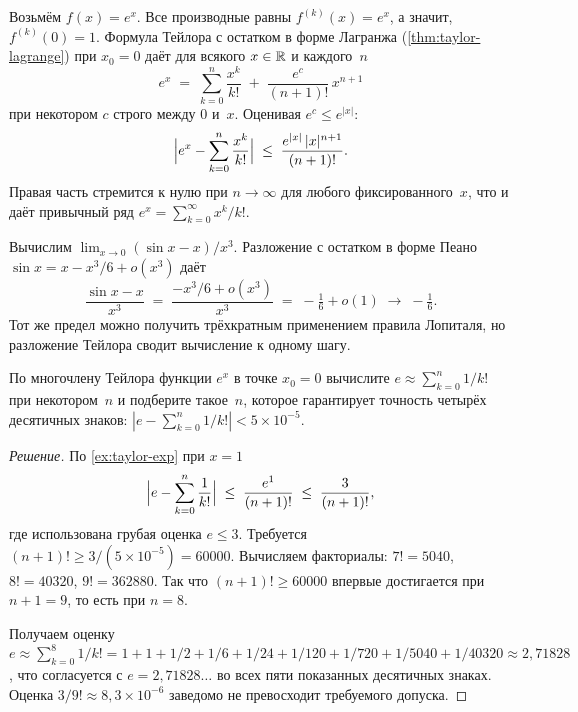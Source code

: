 \begin{example}
\label{ex:taylor-exp}
Возьмём $f(x) = e^x$. Все производные равны $f^{(k)}(x) = e^x$, а
значит, $f^{(k)}(0) = 1$. Формула Тейлора с остатком в форме
Лагранжа (\cref{thm:taylor-lagrange}) при $x_0 = 0$ даёт для всякого
$x \in \mathbb{R}$ и каждого~$n$
\[
  e^x \;=\; \sum_{k=0}^{n} \frac{x^k}{k!} \;+\; \frac{e^c}{(n+1)!}\,x^{n+1}
\]
при некотором $c$ строго между $0$ и~$x$. Оценивая $e^c \le e^{|x|}$:
\[
  \Bigl| e^x - \sum_{k=0}^{n} \frac{x^k}{k!} \Bigr|
  \;\le\; \frac{e^{|x|} \,|x|^{n+1}}{(n+1)!}.
\]
Правая часть стремится к нулю при $n \to \infty$ для любого
фиксированного~$x$, что и даёт привычный ряд
$e^x = \sum_{k=0}^{\infty} x^k / k!$.
\end{example}

\begin{example}
\label{ex:taylor-limit}
Вычислим $\lim_{x \to 0} (\sin x - x) / x^3$. Разложение с остатком в
форме Пеано $\sin x = x - x^3/6 + o(x^3)$ даёт
\[
  \frac{\sin x - x}{x^3} \;=\; \frac{-x^3/6 + o(x^3)}{x^3}
  \;=\; -\tfrac{1}{6} + o(1) \;\to\; -\tfrac{1}{6}.
\]
Тот же предел можно получить трёхкратным применением правила
Лопиталя, но разложение Тейлора сводит вычисление к одному шагу.
\end{example}

\begin{problem}
\label{prob:taylor-estimate-e}
По многочлену Тейлора функции $e^x$ в точке $x_0 = 0$ вычислите
$e \approx \sum_{k=0}^{n} 1/k!$ при некотором~$n$ и подберите такое~$n$,
которое гарантирует точность четырёх десятичных знаков:
$|e - \sum_{k=0}^{n} 1/k!| < 5 \times 10^{-5}$.
\end{problem}

\begin{proof}[Решение]
По \cref{ex:taylor-exp} при $x = 1$
\[
  \Bigl| e - \sum_{k=0}^{n} \frac{1}{k!} \Bigr| \;\le\; \frac{e^1}{(n+1)!}
  \;\le\; \frac{3}{(n+1)!},
\]
где использована грубая оценка $e \le 3$. Требуется
$(n+1)! \ge 3 / (5 \times 10^{-5}) = 60000$. Вычисляем факториалы:
$7! = 5040$, $8! = 40320$, $9! = 362880$. Так что $(n+1)! \ge 60000$
впервые достигается при $n + 1 = 9$, то есть при $n = 8$.

Получаем оценку
$e \approx \sum_{k=0}^{8} 1/k! = 1 + 1 + 1/2 + 1/6 + 1/24 + 1/120 + 1/720 + 1/5040 + 1/40320 \approx 2{,}71828$,
что согласуется с $e = 2{,}71828\ldots$ во всех пяти показанных
десятичных знаках. Оценка $3/9! \approx 8{,}3 \times 10^{-6}$
заведомо не превосходит требуемого допуска.
\end{proof}

